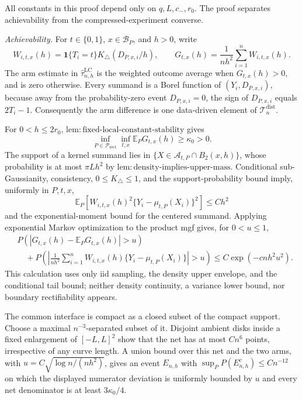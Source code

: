 All constants in this proof depend only on \(q,L,c_-,r_0\).  The proof separates achievability from the compressed-experiment converse.

\emph{Achievability.}
For \(t\in\{0,1\}\), \(x\in\mathcal B_P\), and \(h>0\), write
\[
W_{i,t,x}(h)=\mathbf1\{T_i=t\}K_\triangle(D_{P,x,i}/h),
\qquad
G_{t,x}(h)=\frac1{nh^2}\sum_{i=1}^nW_{i,t,x}(h).
\]
The arm estimate in \(\widehat\tau^{\mathrm{LC}}_{n,h}\) is the weighted outcome average when \(G_{t,x}(h)>0\), and is zero otherwise.  Every summand is a Borel function of \((Y_i,D_{P,x,i})\), because away from the probability-zero event \(D_{P,x,i}=0\), the sign of \(D_{P,x,i}\) equals \(2T_i-1\).  Consequently the arm difference is one data-driven element of \(\mathcal T_n^{\mathrm{dist}}\).

For \(0<h\leq2r_0\), \(\mathrm{lem:fixed\text{-}local\text{-}constant\text{-}stability}\) gives
\[
\inf_{P\in\mathcal P_{\mathrm{rect}}}\inf_{t,x}\mathbb E_PG_{t,x}(h)\geq\kappa_0>0.
\]
The support of a kernel summand lies in \(\{X\in\mathcal A_{t,P}\cap B_2(x,h)\}\), whose probability is at most \(\pi Lh^2\) by \(\mathrm{lem:density\text{-}implies\text{-}upper\text{-}mass}\).  Conditional sub-Gaussianity, consistency, \(0\leq K_\triangle\leq1\), and the support-probability bound imply, uniformly in \(P,t,x\),
\[
\mathbb E_P\!\left[W_{i,t,x}(h)^2\{Y_i-\mu_{t,P}(X_i)\}^2\right]\leq Ch^2
\]
and the exponential-moment bound for the centered summand.  Applying exponential Markov optimization to the product mgf gives, for \(0<u\leq1\),
\[
\begin{aligned}
&P\!\left(\left|G_{t,x}(h)-\mathbb E_PG_{t,x}(h)\right|>u\right)\\
&\quad+P\!\left(\left|\frac1{nh^2}\sum_{i=1}^nW_{i,t,x}(h)
\{Y_i-\mu_{t,P}(X_i)\}\right|>u\right)
\leq C\exp(-cnh^2u^2).
\end{aligned}
\]
This calculation uses only iid sampling, the density upper envelope, and the conditional tail bound; neither density continuity, a variance lower bound, nor boundary rectifiability appears.

The common interface is compact as a closed subset of the compact support.  Choose a maximal \(n^{-3}\)-separated subset of it.  Disjoint ambient disks inside a fixed enlargement of \([-L,L]^2\) show that the net has at most \(Cn^6\) points, irrespective of any curve length.  A union bound over this net and the two arms, with \(u=C\sqrt{\log n/(nh^2)}\), gives an event \(E_{n,h}\) with \(\sup_PP(E_{n,h}^c)\leq Cn^{-12}\) on which the displayed numerator deviation is uniformly bounded by \(u\) and every net denominator is at least \(3\kappa_0/4\).

